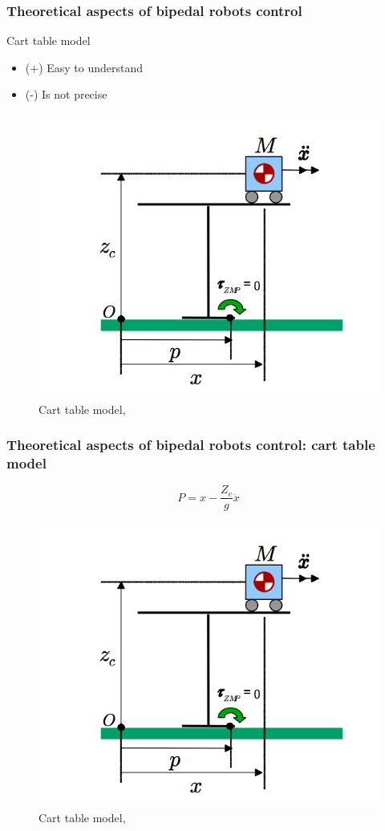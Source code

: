 \documentclass{beamer}
\begin{document}

	\begin{frame}
		\frametitle{Theoretical aspects of bipedal robots control}
		\begin{block}{Cart table model}
			\begin{itemize}
				\item(+)
					Easy to understand
				\item(-)
					Is not precise
					
			\end{itemize}
		\end{block}
		
		\begin{figure}[h!]
			\begin{minipage}[H]{\linewidth}
				\centering
				\includegraphics[width=0.5\linewidth]{presentation_images/11}
				\caption{Cart table model, \cite{kajita2003biped}}
			\end{minipage}
		\end{figure}
	\end{frame}


	\begin{frame}
		\frametitle{Theoretical aspects of bipedal robots control: cart table model}
		\begin{equation}
			P = x - \dfrac{Z_c}{g} \ddot{x}
		\end{equation}		
		\begin{figure}[h!]
			\begin{minipage}[H]{\linewidth}
				\centering
				\includegraphics[width=0.4\linewidth]{presentation_images/11}
				\caption{Cart table model, \cite{kajita2003biped}}
			\end{minipage}
		\end{figure}
	\end{frame}
\end{document}
